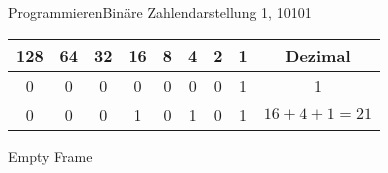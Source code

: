 
\begin{frame}{Programmieren}{Binäre Zahlendarstellung}
		1,
		10101
		
		\begin{tabular}{cccccccc|c}
		128 & 64 & 32 & 16 & 8 & 4 & 2 & 1 & Dezimal \\ \hline 
		0   & 0  & 0  & 0  & 0 & 0 & 0 & 1 & 1 \\ 
		0   & 0  & 0  & 1  & 0 & 1 & 0 & 1 & $16 + 4 + 1 = 21$ \\ 
		\hline 
		\end{tabular} 	
\end{frame}

\begin{frame}[plain]
	Empty Frame
\end{frame}















